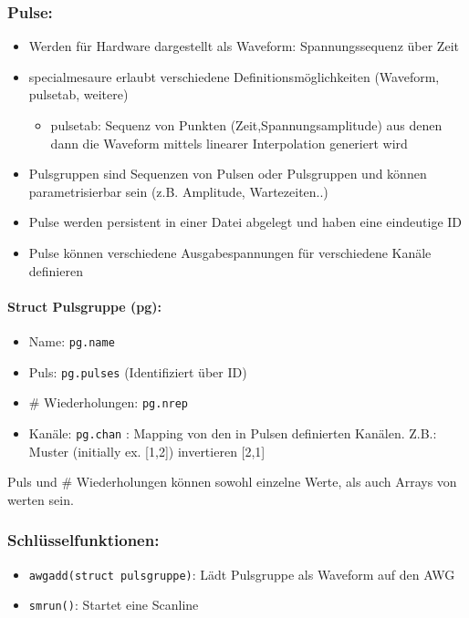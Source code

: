 \documentclass[DIN, pagenumber=false, fontsize=11pt]{scrartcl}
\begin{document}
\subsubsection{ Pulse: }
\begin{itemize}[noitemsep]
 \item Werden für Hardware dargestellt als Waveform: Spannungssequenz über Zeit
 \item specialmesaure erlaubt verschiedene Definitionsmöglichkeiten (Waveform, pulsetab, weitere)
 \begin{itemize}[noitemsep]
 	\item pulsetab: Sequenz von Punkten (Zeit,Spannungsamplitude) aus denen dann die Waveform mittels linearer Interpolation generiert wird
 \end{itemize}
 \item Pulsgruppen sind Sequenzen von Pulsen oder Pulsgruppen und können parametrisierbar sein (z.B. Amplitude, Wartezeiten..)
 \item Pulse werden persistent in einer Datei abgelegt und haben eine eindeutige ID
 \item Pulse können verschiedene Ausgabespannungen für verschiedene Kanäle definieren
\end{itemize}
\paragraph{ Struct Pulsgruppe (pg): }
\begin{itemize}[noitemsep]
 \item Name: \texttt{pg.name}
 \item Puls: \texttt{pg.pulses} (Identifiziert über ID)
 \item \# Wiederholungen: \texttt{pg.nrep} 
 \item Kanäle: \texttt{pg.chan} : Mapping von den in Pulsen definierten Kanälen. Z.B.: Muster (initially ex. [1,2]) invertieren [2,1]
\end{itemize}
Puls und \# Wiederholungen können sowohl einzelne Werte, als auch Arrays von werten sein.

\subsubsection{ Schlüsselfunktionen: }
\begin{itemize}[noitemsep]
 \item \texttt{awgadd(struct pulsgruppe)}: Lädt Pulsgruppe als Waveform auf den AWG
 \item \texttt{smrun()}: Startet eine Scanline
\end{itemize}
\end{document}
